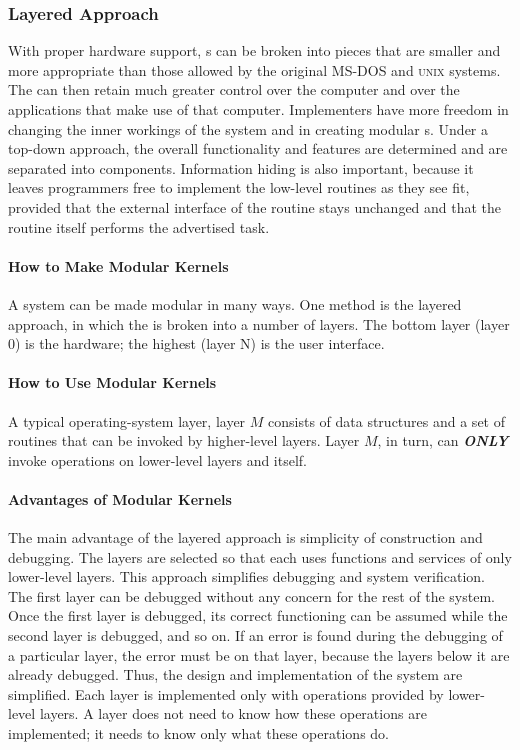 \subsubsection{Layered Approach}\label{subsubsec:Layered_Approach}
With proper hardware support, s can be broken into pieces that are smaller and more appropriate than those allowed by the original MS-DOS and \textsc{unix} systems.
The  can then retain much greater control over the computer and over the applications that make use of that computer.
Implementers have more freedom in changing the inner workings of the system and in creating modular s.
Under a top-down approach, the overall functionality and features are determined and are separated into components.
Information hiding is also important, because it leaves programmers free to implement the low-level routines as they see fit, provided that the external interface of the routine stays unchanged and that the routine itself performs the advertised task.

\paragraph{How to Make Modular Kernels}\label{par:How_Make_Modular_Kernels}
A system can be made modular in many ways.
One method is the layered approach, in which the  is broken into a number of layers.
The bottom layer (layer 0) is the hardware; the highest (layer N) is the user interface.

\paragraph{How to Use Modular Kernels}\label{par:How_Use_Modular_Kernels}
A typical operating-system layer, layer $M$ consists of data structures and a set of routines that can be invoked by higher-level layers.
Layer $M$, in turn, can \textbf{\emph{ONLY}} invoke operations on lower-level layers and itself.

\paragraph{Advantages of Modular Kernels}\label{par:Modular_Kernels_Advantages}
The main advantage of the layered approach is simplicity of construction and debugging.
The layers are selected so that each uses functions and services of only lower-level layers.
This approach simplifies debugging and system verification.
The first layer can be debugged without any concern for the rest of the system.
Once the first layer is debugged, its correct functioning can be assumed while the second layer is debugged, and so on.
If an error is found during the debugging of a particular layer, the error must be on that layer, because the layers below it are already debugged.
Thus, the design and implementation of the system are simplified.
Each layer is implemented only with operations provided by lower-level layers.
A layer does not need to know how these operations are implemented; it needs to know only what these operations do.

